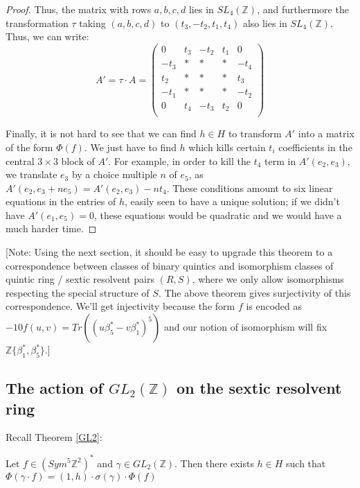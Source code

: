 \documentclass{article}
\begin{document}
\begin{proof}
Thus, the matrix with rows $a,b,c,d$ lies in $SL_4(\mathbb{Z})$, and furthermore the transformation $\tau$ taking $(a,b,c,d)$ to $(t_3, - t_2, t_1, t_4)$ also lies in $SL_4(\mathbb{Z})$.  Thus, we can write:
\begin{equation} A' = \tau \cdot A = 
\begin{pmatrix}
0 & t_3 & - t_2 & t_1 & 0 \\
- t_3 & * & * & * & - t_4 \\
t_2 & * & * & * & t_3 \\
- t_1 & * & * & * & - t_2 \\
0 & t_4 & - t_3 & t_2 & 0 \\
\end{pmatrix}
\end{equation}

Finally, it is not hard to see that we can find $h \in H$ to transform $A'$ into a matrix of the form $\Phi(f)$.  We just have to find $h$ which kills certain $t_i$ coefficients in the central $3 \times 3$ block of $A'$.  For example, in order to kill the $t_4$ term in $A'(e_2, e_3)$, we translate $e_3$ by a choice multiple $n$ of $e_5$, as $A'(e_2, e_3 + n e_5) = A'(e_2, e_3) - n t_4$.  These conditions amount to six linear equations in the entries of $h$, easily seen to have a unique solution; if we didn't have $A'(e_1,e_5) = 0$, these equations would be quadratic and we would have a much harder time.
\end{proof}

[Note: Using the next section, it should be easy to upgrade this theorem to a correspondence between classes of binary quintics and isomorphism classes of quintic ring / sextic resolvent pairs $(R,S)$, where we only allow isomorphisms respecting the special structure of $S$.  The above theorem gives surjectivity of this correspondence.  We'll get injectivity because the form $f$ is encoded as $ - 10 f(u,v) = Tr((u \beta_5^* - v \beta_1^*)^5)$ and our notion of isomorphism will fix $\mathbb{Z} \{ \beta_1^*, \beta_5^* \}$.]

\subsection{The action of $GL_2(\mathbb{Z})$ on the sextic resolvent ring}

Recall Theorem \ref{GL2}:

\begin{theorem} \nonumber
Let $f \in (Sym^5 \mathbb{Z}^2)^*$ and $\gamma \in GL_2(\mathbb{Z})$.  Then there exists $h \in H$ such that $\Phi( \gamma \cdot f) = (1,h) \cdot \sigma ( \gamma ) \cdot \Phi(f)$
\end{theorem}
\end{document}
